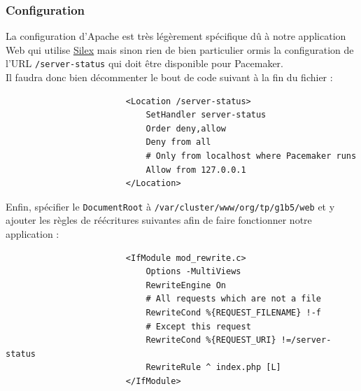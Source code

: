 \documentclass[11pt,a4paper]{report}
\begin{document}
                \subsubsection{Configuration}
                    
                    La configuration d'Apache est très légèrement spécifique dû à notre application Web qui utilise \underline{\href{http://silex.sensiolabs.org}{Silex}} mais sinon rien de bien particulier ormis la configuration de l'URL \verb+/server-status+ qui doit être disponible pour Pacemaker.\\
                    
                    Il faudra donc bien décommenter le bout de code suivant à la fin du fichier :\\
                    
                    \begin{verbatim}
                        <Location /server-status>
                            SetHandler server-status
                            Order deny,allow
                            Deny from all
                            # Only from localhost where Pacemaker runs
                            Allow from 127.0.0.1
                        </Location>
                    \end{verbatim}
                    
                    Enfin, spécifier le \verb+DocumentRoot+ à \verb+/var/cluster/www/org/tp/g1b5/web+ et y ajouter les règles de réécritures suivantes afin de faire fonctionner notre application :\\
                    
                    \begin{verbatim}
                        <IfModule mod_rewrite.c>
                            Options -MultiViews
                            RewriteEngine On
                            # All requests which are not a file
                            RewriteCond %{REQUEST_FILENAME} !-f
                            # Except this request
                            RewriteCond %{REQUEST_URI} !=/server-status
                            RewriteRule ^ index.php [L]
                        </IfModule>
                    \end{verbatim}
                    
\end{document}
